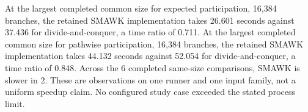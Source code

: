 At the largest completed common size for expected participation, 16,384 branches, the retained SMAWK implementation takes 26.601 seconds against 37.436 for divide-and-conquer, a time ratio of 0.711. At the largest completed common size for pathwise participation, 16,384 branches, the retained SMAWK implementation takes 44.132 seconds against 52.054 for divide-and-conquer, a time ratio of 0.848. Across the 6 completed same-size comparisons, SMAWK is slower in 2. These are observations on one runner and one input family, not a uniform speedup claim. No configured study case exceeded the stated process limit.
